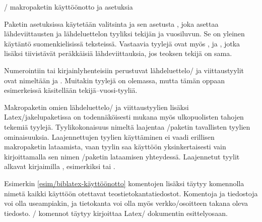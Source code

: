 \begin{esimerkki*}

\begin{koodilohko}
\usepackage{polyglossia}

\usepackage{csquotes}

\usepackage[style=authoryear]{biblatex}
\end{koodilohko}
  \caption{\-/ makropaketin käyttöönotto ja asetuksia}
  \label{esim/biblatex-käyttöönotto}
\end{esimerkki*}

Paketin asetuksissa käytetään valitsinta  ja sen asetusta
, joka asettaa lähdeviittausten ja lähdeluettelon
tyyliksi tekijän ja vuosiluvun. Se on yleinen käytäntö suomenkielisissä
teksteissä. Vastaavia tyylejä ovat myös ,
 ja , jotka lisäksi
tiivistävät peräkkäisiä lähdeviittauksia, jos teoksen tekijä on sama.

Numerointiin tai kirjainlyhenteisiin perustuvat lähdeluettelo\-/{} ja
viittaustyylit ovat nimeltään  ja
. Muitakin tyylejä on olemassa, mutta tämän
oppaan esimerkeissä käsitellään tekijä--vuosi-tyyliä.

Makropaketin omien lähdeluettelo\-/{} ja viittaustyylien lisäksi
Latex\-/jakelupaketissa on todennäköisesti mukana myös ulkopuolisten
tahojen tekemiä tyylejä. Tyylikokonaisuus nimeltä
 laajentaa
\-/paketin tavallisten tyylien ominaisuuksia.
Laajennettujen tyylien käyttäminen ei vaadi erillisen makropaketin
lataamista, vaan tyylin saa käyttöön yksinkertaisesti vain
kirjoittamalla sen nimen \-/paketin lataamisen
yhteydessä. Laajennetut tyylit alkavat kirjaimilla \mbox{,}
esimerkiksi  tai .

Esimerkin \ref{esim/biblatex-käyttöönotto} komentojen lisäksi täytyy
komennolla  nimetä kaikki käyttöön otettavat
teostietokantatiedostot. Komentoja ja tiedostoja voi olla useampiakin,
ja tietokanta voi olla myös verkko\-/osoitteen takana oleva tiedosto.
\-/ komennot täytyy kirjoittaa Latex\-/
dokumentin esittelyosaan.

